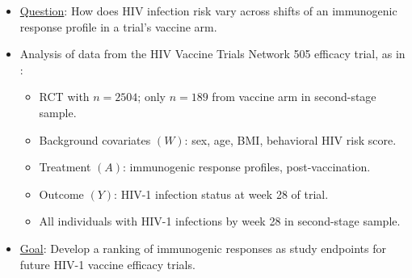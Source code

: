 \documentclass[landscape,a0paper,fontscale=0.285]{baposter} %
\newcommand{\compresslist}{ %
\setlength{\itemsep}{1pt}
\setlength{\parskip}{0pt}
\setlength{\parsep}{0pt}
}
\begin{document}
\begin{poster}
{\begin{itemize}\compresslist
\setlength\itemsep{0.5em}
\item \underline{Question}: How does HIV infection risk vary across shifts of an
  immunogenic response profile in a trial's vaccine arm.
\item Analysis of data from the HIV Vaccine Trials Network 505 efficacy trial,
  as in \cite{janes2017higher}:
  \begin{itemize}
    \itemsep0.25pt
    \item RCT with $n = 2504$; only $n = 189$ from vaccine arm in second-stage
      sample.
    \item Background covariates $(W)$: sex, age, BMI, behavioral HIV risk score.
    \item Treatment $(A)$: immunogenic response profiles, post-vaccination.
    \item Outcome $(Y)$: HIV-1 infection status at week 28 of trial.
    \item All individuals with HIV-1 infections by week 28 in second-stage
      sample.
  \end{itemize}
\item \underline{Goal}: Develop a ranking of immunogenic responses as study
  endpoints for future HIV-1 vaccine efficacy trials.
\end{itemize}
}


\end{poster}
\end{document}
